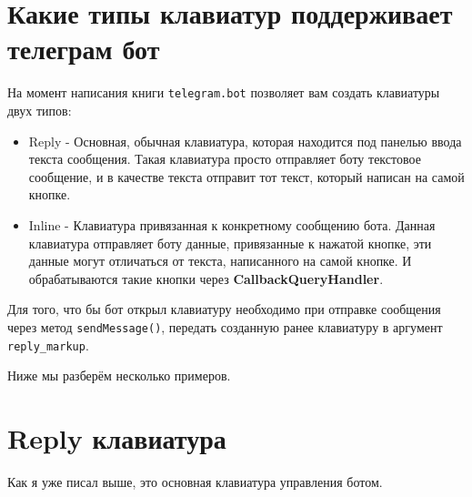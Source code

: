 \documentclass[
]{book}
\providecommand{\tightlist}{%
  \setlength{\itemsep}{0pt}\setlength{\parskip}{0pt}}
\begin{document}
\section{Какие типы клавиатур поддерживает телеграм бот}\label{ux43aux430ux43aux438ux435-ux442ux438ux43fux44b-ux43aux43bux430ux432ux438ux430ux442ux443ux440-ux43fux43eux434ux434ux435ux440ux436ux438ux432ux430ux435ux442-ux442ux435ux43bux435ux433ux440ux430ux43c-ux431ux43eux442}

На момент написания книги \texttt{telegram.bot} позволяет вам создать клавиатуры двух типов:

\begin{itemize}
\tightlist
\item
  Reply - Основная, обычная клавиатура, которая находится под панелью ввода текста сообщения. Такая клавиатура просто отправляет боту текстовое сообщение, и в качестве текста отправит тот текст, который написан на самой кнопке.
\item
  Inline - Клавиатура привязанная к конкретному сообщению бота. Данная клавиатура отправляет боту данные, привязанные к нажатой кнопке, эти данные могут отличаться от текста, написанного на самой кнопке. И обрабатываются такие кнопки через \textbf{CallbackQueryHandler}.
\end{itemize}

Для того, что бы бот открыл клавиатуру необходимо при отправке сообщения через метод \texttt{sendMessage()}, передать созданную ранее клавиатуру в аргумент \texttt{reply\_markup}.

Ниже мы разберём несколько примеров.

\section{Reply клавиатура}\label{reply-ux43aux43bux430ux432ux438ux430ux442ux443ux440ux430}

Как я уже писал выше, это основная клавиатура управления ботом.
\end{document}
